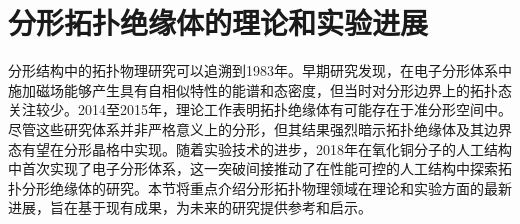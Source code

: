 \section{分形拓扑绝缘体的理论和实验进展}
分形结构中的拓扑物理研究可以追溯到1983年。早期研究发现，在电子分形体系中施加磁场能够产生具有自相似特性的能谱和态密度\cite{alexander1984some,banavar1985energy}，但当时对分形边界上的拓扑态关注较少。2014至2015年，理论工作表明拓扑绝缘体有可能存在于准分形空间中\cite{song2014topological,he2015topological}。尽管这些研究体系并非严格意义上的分形，但其结果强烈暗示拓扑绝缘体及其边界态有望在分形晶格中实现。随着实验技术的进步，2018年在氧化铜分子的人工结构中首次实现了电子分形体系\cite{kempkes2019design}，这一突破间接推动了在性能可控的人工结构中探索拓扑分形绝缘体的研究。本节将重点介绍分形拓扑物理领域在理论和实验方面的最新进展，旨在基于现有成果，为未来的研究提供参考和启示。
